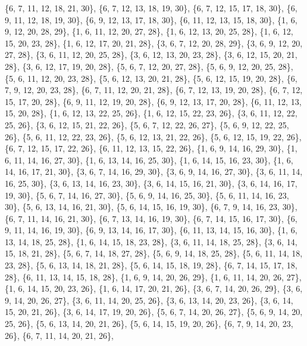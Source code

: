 \documentclass[11pt,a4paper]{article}
\begin{document}
{\{6, 7, 11, 12, 18, 21, 30\}, \{6, 7, 12, 13, 18, 19, 30\}, \{6, 7, 12, 15, 17, 18, 30\}, \{6, 9, 11, 12, 18, 19, 30\}, \{6, 9, 12, 13, 17, 18, 30\},
\{6, 11, 12, 13, 15, 18, 30\}, \{1, 6, 9, 12, 20, 28, 29\}, \{1, 6, 11, 12, 20, 27, 28\}, \{1, 6, 12, 13, 20, 25, 28\}, \{1, 6, 12, 15, 20, 23, 28\},
\{1, 6, 12, 17, 20, 21, 28\}, \{3, 6, 7, 12, 20, 28, 29\}, \{3, 6, 9, 12, 20, 27, 28\}, \{3, 6, 11, 12, 20, 25, 28\}, \{3, 6, 12, 13, 20, 23, 28\},
\{3, 6, 12, 15, 20, 21, 28\}, \{3, 6, 12, 17, 19, 20, 28\}, \{5, 6, 7, 12, 20, 27, 28\}, \{5, 6, 9, 12, 20, 25, 28\}, \{5, 6, 11, 12, 20, 23, 28\},
\{5, 6, 12, 13, 20, 21, 28\}, \{5, 6, 12, 15, 19, 20, 28\}, \{6, 7, 9, 12, 20, 23, 28\}, \{6, 7, 11, 12, 20, 21, 28\}, \{6, 7, 12, 13, 19, 20, 28\},
\{6, 7, 12, 15, 17, 20, 28\}, \{6, 9, 11, 12, 19, 20, 28\}, \{6, 9, 12, 13, 17, 20, 28\}, \{6, 11, 12, 13, 15, 20, 28\}, \{1, 6, 12, 13, 22, 25, 26\},
\{1, 6, 12, 15, 22, 23, 26\}, \{3, 6, 11, 12, 22, 25, 26\}, \{3, 6, 12, 15, 21, 22, 26\}, \{5, 6, 7, 12, 22, 26, 27\}, \{5, 6, 9, 12, 22, 25, 26\},
\{5, 6, 11, 12, 22, 23, 26\}, \{5, 6, 12, 13, 21, 22, 26\}, \{5, 6, 12, 15, 19, 22, 26\}, \{6, 7, 12, 15, 17, 22, 26\}, \{6, 11, 12, 13, 15, 22, 26\},
\{1, 6, 9, 14, 16, 29, 30\}, \{1, 6, 11, 14, 16, 27, 30\}, \{1, 6, 13, 14, 16, 25, 30\}, \{1, 6, 14, 15, 16, 23, 30\}, \{1, 6, 14, 16, 17, 21, 30\},
\{3, 6, 7, 14, 16, 29, 30\}, \{3, 6, 9, 14, 16, 27, 30\}, \{3, 6, 11, 14, 16, 25, 30\}, \{3, 6, 13, 14, 16, 23, 30\}, \{3, 6, 14, 15, 16, 21, 30\},
\{3, 6, 14, 16, 17, 19, 30\}, \{5, 6, 7, 14, 16, 27, 30\}, \{5, 6, 9, 14, 16, 25, 30\}, \{5, 6, 11, 14, 16, 23, 30\}, \{5, 6, 13, 14, 16, 21, 30\},
\{5, 6, 14, 15, 16, 19, 30\}, \{6, 7, 9, 14, 16, 23, 30\}, \{6, 7, 11, 14, 16, 21, 30\}, \{6, 7, 13, 14, 16, 19, 30\}, \{6, 7, 14, 15, 16, 17, 30\},
\{6, 9, 11, 14, 16, 19, 30\}, \{6, 9, 13, 14, 16, 17, 30\}, \{6, 11, 13, 14, 15, 16, 30\}, \{1, 6, 13, 14, 18, 25, 28\}, \{1, 6, 14, 15, 18, 23, 28\},
\{3, 6, 11, 14, 18, 25, 28\}, \{3, 6, 14, 15, 18, 21, 28\}, \{5, 6, 7, 14, 18, 27, 28\}, \{5, 6, 9, 14, 18, 25, 28\}, \{5, 6, 11, 14, 18, 23, 28\},
\{5, 6, 13, 14, 18, 21, 28\}, \{5, 6, 14, 15, 18, 19, 28\}, \{6, 7, 14, 15, 17, 18, 28\}, \{6, 11, 13, 14, 15, 18, 28\}, \{1, 6, 9, 14, 20, 26, 29\},
\{1, 6, 11, 14, 20, 26, 27\}, \{1, 6, 14, 15, 20, 23, 26\}, \{1, 6, 14, 17, 20, 21, 26\}, \{3, 6, 7, 14, 20, 26, 29\}, \{3, 6, 9, 14, 20, 26, 27\},
\{3, 6, 11, 14, 20, 25, 26\}, \{3, 6, 13, 14, 20, 23, 26\}, \{3, 6, 14, 15, 20, 21, 26\}, \{3, 6, 14, 17, 19, 20, 26\}, \{5, 6, 7, 14, 20, 26, 27\},
\{5, 6, 9, 14, 20, 25, 26\}, \{5, 6, 13, 14, 20, 21, 26\}, \{5, 6, 14, 15, 19, 20, 26\}, \{6, 7, 9, 14, 20, 23, 26\}, \{6, 7, 11, 14, 20, 21, 26\},
}
\end{document}
